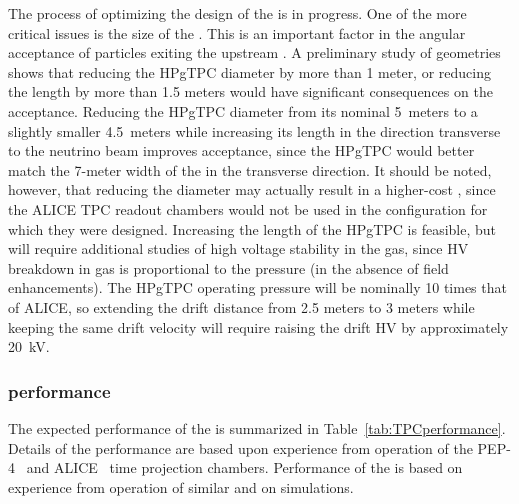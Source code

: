  The process of optimizing the design of the  is in progress. One of the more critical issues is the size of the .  This is an important factor in the angular acceptance of particles exiting the upstream . A preliminary study of geometries shows that reducing the HPgTPC diameter by more than 1 meter, or reducing the length by more than 1.5 meters would have significant consequences on the acceptance. Reducing the HPgTPC diameter from its nominal 5~meters to a slightly smaller 4.5~meters while increasing its length in the direction transverse to the neutrino beam improves acceptance, since the HPgTPC would better match the 7-meter width of the  in the transverse direction. It should be noted, however, that reducing the diameter may actually result in a higher-cost , since the ALICE TPC readout chambers would not be used in the configuration for which they were designed. Increasing the length of the HPgTPC is feasible, but will require additional studies of high voltage stability in the gas, since HV breakdown in gas is proportional to the pressure (in the absence of field enhancements).  The HPgTPC operating pressure will be nominally 10 times that of ALICE, so extending the drift distance from 2.5 meters to 3 meters while keeping the same drift velocity will require raising the drift HV by approximately 20~kV.



\subsubsection{ performance}
The expected performance of the  is summarized in Table~\ref{tab:TPCperformance}. Details of the  performance are based upon experience from operation of the PEP-4~\cite{PEP4_results_Layter,PEP4_Stork,Madaras:1982cj} and ALICE~\cite{Alessandro:2006yt} time projection chambers. Performance of the  is based on experience from operation of similar  and on simulations. 

